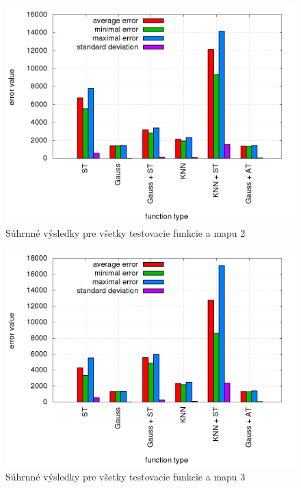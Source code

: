 \begin{figure}[!htb]
\centering
\includegraphics[scale=.4]{../../results_q_learning/map_2/trials_average_results.png}
\caption{Súhrnné výsledky pre všetky testovacie funkcie a mapu 2}
\label{img:experiment_average_2}
\end{figure}

\begin{figure}[!htb]
\centering
\includegraphics[scale=.4]{../../results_q_learning/map_3/trials_average_results.png}
\caption{Súhrnné výsledky pre všetky testovacie funkcie a mapu 3}
\label{img:experiment_average_3}
\end{figure}

